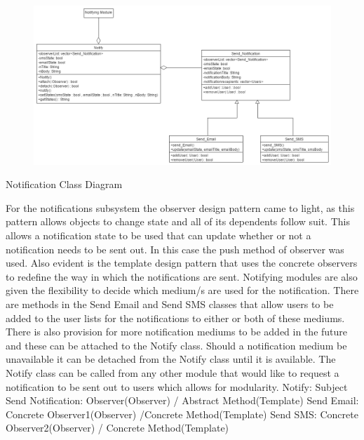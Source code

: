 \documentclass{article}
\begin{document}
\begin{figure}[h!]
  \includegraphics[width=1.3\textwidth]{Notifications_Class_Diagram.png}
\end{figure}
Notification Class Diagram
\begin{flushleft}
For the notifications subsystem the observer design pattern came to light, as this pattern allows objects to change state and all of its dependents follow suit. This allows a notification state to be used that can update whether or not a notification needs to be sent out. In this case the push method of observer was used. Also evident is the template design pattern that uses the concrete observers to redefine the way in which the notifications are sent. Notifying modules are also given the flexibility to decide which medium/s are used for the notification.
\bigskip
\newline
There are methods in the Send Email and Send SMS classes that allow users to be added to the user lists for the notifications to either or both of these mediums. There is also provision for more notification mediums to be added in the future and these can be attached to the Notify class. Should a notification medium be unavailable it can be detached from the Notify class until it is available. The Notify class can be called from any other module that would like to request a notification to be sent out to users which allows for modularity.
\bigskip
\newline
Notify: Subject
\newline
Send Notification: Observer(Observer) / Abstract Method(Template)
\newline
Send Email: Concrete Observer1(Observer) /Concrete Method(Template)
\newline
Send SMS: Concrete Observer2(Observer) / Concrete Method(Template)
\end{flushleft}
\mbox{}\\
\bigskip
\clearpage
\end{document}
